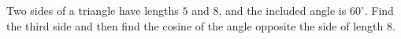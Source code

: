 Two sides of a triangle have lengths $5$ and $8$, and the included angle is $60^\circ$. Find the third side and then find the cosine of the angle opposite the side of length $8$.
